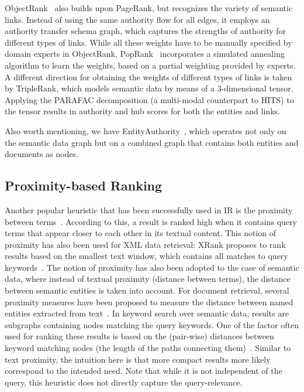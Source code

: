 ObjectRank~\cite{DBLP:conf/vldb/BalminHP04} also builds upon PageRank, but recognizes the variety of semantic links. Instead of using the same authority flow for all edges, it employs an authority transfer schema graph, which captures the strengths of authority for different types of links. While all these weights have to be manually specified by domain experts in ObjectRank, PopRank~\cite{DBLP:conf/www/NieZWM05} incorporates a simulated annealing algorithm to learn the weights, based on a partial weighting provided by experts. A different direction for obtaining the weights of different types of links is taken by TripleRank, which models semantic data by means of a 3-dimensional tensor. Applying the PARAFAC decomposition (a multi-modal counterpart to HITS) to the tensor results in authority and hub scores for both the entities and links. 

Also worth mentioning, we have EntityAuthority~\cite{DBLP:conf/webdb/StoyanovichBBW07}, which operates not only on the semantic data graph but on a combined graph that contains both entities and documents as nodes. 

\subsection{Proximity-based Ranking} Another popular heuristic that has been successfully used in IR is the proximity between terms~\cite{DBLP:conf/sigir/ButtcherCL06a,DBLP:conf/sigir/TaoZ07}. According to this, a result is ranked high when it contains query terms that appear closer to each other in its textual content. This notion of proximity has also been used for XML data retrieval: XRank proposes to rank results based on the smallest text window, which contains all matches to query keywords~\cite{DBLP:conf/sigmod/GuoSBS03}. The notion of proximity has also been adopted to the case of semantic data, where instead of textual proximity (distance between terms), the distance between semantic entities is taken into account. For document retrieval, several proximity measures have been proposed to measure the distance between named entities extracted from text~\cite{DBLP:conf/iiwas/LeCHC11}. In keyword search over semantic data, results are subgraphs containing nodes matching the query keywords. One of the factor often used for ranking these results is based on the (pair-wise) distances between keyword matching nodes (the length of the paths connecting them)~\cite{DBLP:conf/cikm/LadwigT11,DBLP:conf/icde/TranWRC09,DBLP:conf/sigmod/LiJLF09}. Similar to text proximity, the intuition here is that more compact results more likely correspond to the intended need. Note that while it is not independent of the query, this heuristic does not directly capture the query-relevance. 

